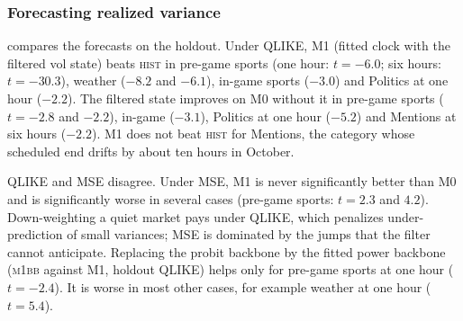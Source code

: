 \subsubsection{Forecasting realized variance}\label{sec:dyn-res-forecast}

 compares the forecasts on the holdout.
Under QLIKE, M1 (fitted clock with the filtered
  vol state) beats \textsc{hist} in pre-game sports (one hour: $t=-6.0$; six hours: $t=-30.3$),
  weather ($-8.2$ and $-6.1$), in-game sports ($-3.0$) and Politics at one hour ($-2.2$).
The filtered state improves on M0 without it in pre-game
  sports ($t=-2.8$ and $-2.2$), in-game ($-3.1$), Politics at one hour ($-5.2$) and Mentions at six
  hours ($-2.2$).
M1 does not beat \textsc{hist} for Mentions, the category whose
  scheduled end drifts by about ten hours in October.

QLIKE and MSE disagree. Under MSE, M1 is never significantly better than M0 and is
  significantly worse in several cases (pre-game sports: $t=2.3$ and $4.2$). Down-weighting a quiet
  market pays under QLIKE, which penalizes under-prediction of small variances; MSE is dominated by
  the jumps that the filter cannot anticipate.
Replacing the probit backbone by the fitted power backbone (\textsc{m1bb}
  against M1, holdout QLIKE) helps only for pre-game sports at one hour ($t=-2.4$). It is worse in
  most other cases, for example weather at one hour ($t=5.4$).

